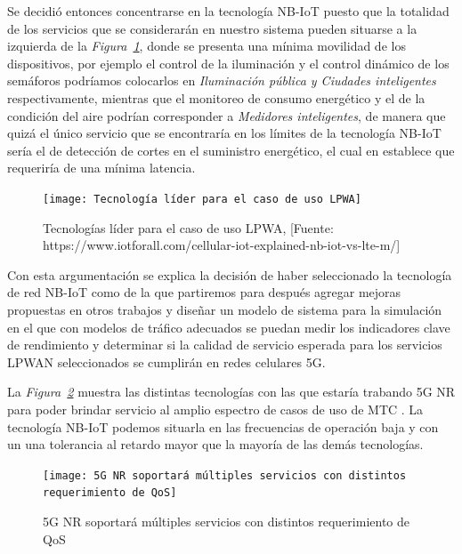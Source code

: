 Se decidió entonces concentrarse en la tecnología NB-IoT puesto que la totalidad de los servicios que se considerarán en nuestro sistema pueden situarse a la izquierda de la \textit{Figura~\ref{fig:lpwa}}, donde se presenta una mínima movilidad de los dispositivos, por ejemplo el control de la iluminación y el control dinámico de los semáforos podríamos colocarlos en \textit{Iluminación pública y Ciudades inteligentes }respectivamente, mientras que el monitoreo de consumo energético y el de la condición del aire podrían corresponder a \textit{Medidores inteligentes}, de manera que quizá el único servicio que se encontraría en los límites de la tecnología NB-IoT sería el de detección de cortes en el suministro energético, el cual en \parencite{NetTrafficIoT} establece que requeriría de una mínima latencia.\newline


\begin{figure}[th]
\centering
\texttt{[image: Tecnología líder para el caso de uso LPWA]}
\decoRule
\caption[Tecnologías líder para el caso de uso LPWA]{Tecnologías líder para el caso de uso LPWA, [Fuente: https://www.iotforall.com/cellular-iot-explained-nb-iot-vs-lte-m/]}
\label{fig:lpwa}
\end{figure}

Con esta argumentación se explica la decisión de haber seleccionado la tecnología de red NB-IoT como de la que partiremos para después agregar mejoras propuestas en otros trabajos y diseñar un modelo de sistema para la simulación en el que con modelos de tráfico adecuados se puedan medir los indicadores clave de rendimiento y determinar si la calidad de servicio esperada para los servicios LPWAN seleccionados se cumplirán en redes celulares 5G.

La \textit{Figura~\ref{fig:5gqos}} muestra las distintas tecnologías con las que estaría trabando 5G NR para poder brindar servicio al amplio espectro de casos de uso de MTC \parencite{5GAmericas}. La tecnología NB-IoT podemos situarla en las frecuencias de operación baja y con un una tolerancia al retardo mayor que la mayoría de las demás tecnologías.

\begin{figure}[th]
\centering
\texttt{[image: 5G NR soportará múltiples servicios con distintos requerimiento de QoS]}
\decoRule
\caption[5G NR soportará múltiples servicios con distintos requerimiento de QoS]{5G NR soportará múltiples servicios con distintos requerimiento de QoS}
\label{fig:5gqos}
\end{figure}

